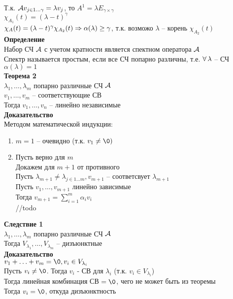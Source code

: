 \documentclass[12pt]{article}
\begin{document}
Т.к. $\mathcal{A} v_{j\in 1\ldots\gamma} = \lambda v_j$, то $A^1 = \lambda E_{\gamma\times \gamma}$\\
$\chi_{A_1}(t) = (\lambda - t)^\gamma$\\
$\chi_A(t) = (\lambda - t)^\gamma\chi_{A_2}(t) \Rightarrow \alpha(\lambda) \geq \gamma$, т.к. возможо $\lambda$ -- корень $\chi_{A_2}(t)$\\
\textbf{Определение}\\
Набор СЧ $\mathcal{A}$ с учетом кратности является спектном оператора $\mathcal{A}$\\
Спектр называется простым, если все СЧ попарно различны, т.е. $\forall\, \lambda$ -- СЧ $\alpha(\lambda) = 1$\\
\textbf{Теорема 2}\\
$\lambda_1, \ldots, \lambda_m$ попарно различные СЧ $\mathcal{A}$\\
$v_1, \ldots, v_m$ -- соответствующие СВ\\
Тогда $v_1, \ldots, v_n$ -- линейно независимые\\
\textbf{Доказательство}\\
Методом математической индукции:
\begin{enumerate}
    \item $m = 1$ -- очевидно (т.к. $v_1 \neq \0)$
    \item Пусть верно для $m$\\
    Докажем для $m+1$ от противного\\
    Пусть $\lambda_{m+1} \neq \lambda_{j \in 1\ldots m}, v_{m+1}$ -- соответсвует $\lambda_{m+1}$\\
    Пусть $v_1,\ldots,v_{m+1}$ линейно зависимые\\
    Тогда $v_{m+1} = \sum_{i=1}^m \alpha_i v_i$\\
    //todo
\end{enumerate}
\textbf{Следствие 1}\\
$\lambda_1, \ldots, \lambda_m$ попарно различные СЧ $\mathcal{A}$\\
Тогда $V_{\lambda_1}, \ldots, V_{\lambda_m}$ -- дизъюнктные\\
\textbf{Доказательство}\\
$v_1 + \ldots + v_m = \0, v_i \in V_{\lambda_i}$\\
Пусть $v_i \neq \0$. Тогда $v_i$ - СВ для $\lambda_i$ (т.к. $v_i \in V_{\lambda_i}$)\\
Тогда линейная комбинация СВ $=\0$, чего не может быть из теоремы\\
Тогда $v_i = \0$, откуда дизъюнктность\\
\end{document}
